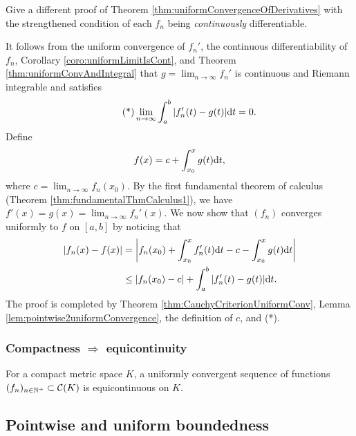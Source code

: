 \begin{exc}
  Give a different proof of Theorem
  \ref{thm:uniformConvergenceOfDerivatives}
  with the strengthened condition of
  each $f_n$ being \emph{continuously} differentiable. 
\end{exc}
\begin{solution}
  It follows from the uniform convergence of $f_n'$,
  the continuous differentiability of $f_n$,
  Corollary \ref{coro:uniformLimitIsCont},
  and Theorem \ref{thm:uniformConvAndIntegral} that
  $g = \lim_{n\rightarrow \infty}f_n'$ is continuous and Riemann integrable
  and satisfies
  \begin{equation*}
    \tag{*}
    \lim_{n\rightarrow \infty}\int_a^b|f_n'(t) - g(t)| \mathrm{d} t = 0.
  \end{equation*}
  Define
  \begin{equation*}
    f(x) = c + \int_{x_0}^x g(t) \mathrm{d} t,
  \end{equation*}
  where $c = \lim_{n\rightarrow \infty}f_n(x_0)$.
  By the first fundamental theorem of calculus
  (Theorem \ref{thm:fundamentalThmCalculus1}),
  we have $f'(x) = g(x) = \lim_{n\rightarrow \infty}f_n'(x)$.
  We now show that $(f_n)$ converges uniformly to $f$ on $[a, b]$
  by noticing that
  \begin{align*}
    |f_n(x) - f(x)| &= \left| f_n(x_0) + \int_{x_0}^xf_n'(t)\mathrm{d} t - c - \int_{x_0}^xg(t)\mathrm{d} t \right| \\
    &\le |f_n(x_0) - c| + \int_a^b|f'_n(t) - g(t)|\mathrm{d} t.
  \end{align*}
  The proof is completed by Theorem \ref{thm:CauchyCriterionUniformConv},
  Lemma \ref{lem:pointwise2uniformConvergence},
  the definition of $c$,
  and (*).
\end{solution}

\subsubsection{Compactness $\Rightarrow$ equicontinuity}

\begin{thm}
  \label{thm:uniformConvergenceAndCompact2EquiCont}
  For a compact metric space $K$,
  a uniformly convergent sequence of functions 
  $(f_n)_{n\in\mathbb{N}^+}\subset {\cal C}(K)$
  is equicontinuous on $K$. 
\end{thm}

\subsection{Pointwise and uniform boundedness}

